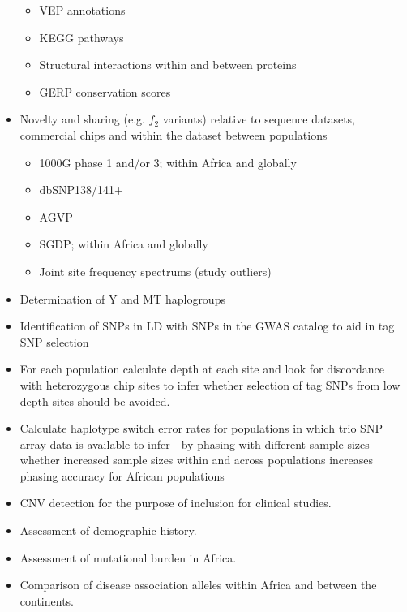 \begin{itemize}
  \begin{itemize}
   \item{VEP annotations}
   \item{KEGG pathways}
   \item{Structural interactions within and between proteins
   }
   \item{GERP conservation scores}
  \end{itemize}
 \item Novelty and sharing (e.g. $f_2$ variants) relative to sequence datasets, commercial chips and within the dataset between populations
 \begin{itemize}
  \item 1000G phase 1 and/or 3; within Africa and globally
  \item dbSNP138/141+
  \item AGVP
  \item SGDP; within Africa and globally
  \item Joint site frequency spectrums (study outliers)
 \end{itemize}
 \item{Determination of Y and MT haplogroups
 }
 \item Identification of SNPs in LD with SNPs in the GWAS catalog to aid in tag SNP selection
 \item For each population calculate depth at each site and look for discordance with heterozygous chip sites to infer whether selection of tag SNPs from low depth sites should be avoided.
 \item {Calculate haplotype switch error rates for populations in which trio SNP array data is available to infer - by phasing with different sample sizes - whether increased sample sizes within and across populations increases phasing accuracy for African populations
 }
  \item CNV detection for the purpose of inclusion for clinical studies.
  \item Assessment of demographic history.
  \item Assessment of mutational burden in Africa.
  \item Comparison of disease association alleles within Africa and between the continents.
\end{itemize}


